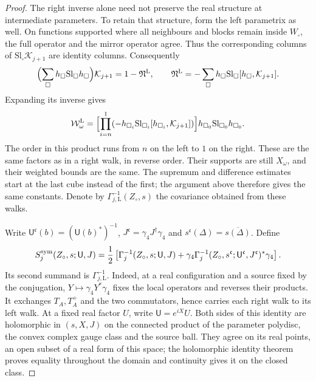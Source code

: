 \documentclass[11pt,letterpaper,reqno]{amsart}
\theoremstyle{definition}
\theoremstyle{remark}
\begin{document}
\begin{proof}
The right inverse alone need not preserve the real structure at
intermediate parameters.  To retain that structure, form the left
parametrix as well. On functions supported where all neighbours
and blocks remain inside $W_\square$, the full operator and
the mirror operator agree. Thus the corresponding columns of
$\mathrm{Sl}_\square\mathcal K_{j+1}$ are identity columns.
Consequently
\[
 \Bigl(\sum_\square h_\square\mathrm{Sl}_\square h_\square\Bigr)
       \mathcal K_{j+1}=1-\mathfrak N^{\rm L},\qquad
 \mathfrak N^{\rm L}=-\sum_\square
       h_\square\mathrm{Sl}_\square[h_\square,\mathcal K_{j+1}].
\]
Expanding its inverse gives
\[
 \mathcal W^{\rm L}_\omega=
 \Bigl[\prod_{i=n}^{1}
       (-h_{\square_i}\mathrm{Sl}_{\square_i}
                       [h_{\square_i},\mathcal K_{j+1}])\Bigr]
       h_{\square_0}\mathrm{Sl}_{\square_0}h_{\square_0}.
\]
The order in this product runs from $n$ on the left to $1$ on
the right.  These are the same factors as in a right walk, in
reverse order.  Their supports are still $X_\omega$, and their
weighted bounds are the same.  The supremum and difference estimates
start at the last cube instead of the first; the argument above
therefore gives the same constants.  Denote by
$\Gamma_{j,\mathrm L}^{-1}(Z_\circ,s)$ the covariance obtained
from these walks.

Write $\mathsf U^{\mathfrak c}(b)=(\mathsf U(b)^*)^{-1}$,
$J^{\mathfrak c}=\gamma_4J^\dagger\gamma_4$ and
$s^{\mathfrak c}(\Delta)=\overline{s(\Delta)}$.  Define
\begin{equation}\label{eq:qcd-symmetric-covariance}
 S_j^{\rm sym}(Z_\circ,s;\mathsf U,J)
 =\frac12\left[\Gamma_j^{-1}(Z_\circ,s;\mathsf U,J)
 +\gamma_4\Gamma_j^{-1}
       (Z_\circ,s^{\mathfrak c};\mathsf U^{\mathfrak c},
                                   J^{\mathfrak c})^*\gamma_4\right].
\end{equation}
Its second summand is $\Gamma_{j,\mathrm L}^{-1}$.
Indeed, at a real configuration and a source fixed by the
conjugation, $Y\mapsto\gamma_4Y^*\gamma_4$ fixes the local
operators and reverses their products.  It exchanges $T_A,T_A^+$
and the two commutators, hence carries each right walk to its left
walk.  At a fixed real factor $U$, write $\mathsf U=e^{iX}U$.
Both sides of this identity are holomorphic in $(s,X,J)$ on the
connected product of the parameter polydisc, the convex complex
gauge class and the source ball.  They agree on its real points,
an open subset of a real form of this space; the holomorphic
identity theorem proves equality throughout the domain and
continuity gives it on the closed class.


\end{proof}
\end{document}
